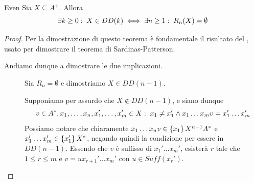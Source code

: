 \begin{theorem}{Even}
  Sia \(X \subseteq A^+\). Allora 
  \[\exists k \geq 0 :\; X \in DD(k) \iff \exists n \geq 1 :\; R_n(X) = \emptyset\]
\end{theorem}

\begin{proof}
  Per la dimostrazione di questo teorema è fondamentale il risultato del , usato per dimostrare il teorema di Sardinas-Patterson.

  Andiamo dunque a dimostrare le due implicazioni.
  \begin{description}
    \item[\q{\(\impliedby\)}] 
      Sia \(R_n = \emptyset\) e dimostriamo \(X \in DD(n-1)\).

      Supponiamo per assurdo che \(X \not\in DD(n-1)\), e siano dunque
      \[v \in A^*, x_1,\ldots,x_n,x_1',\ldots,x_m' \in X :\; x_1\neq x_1' \land x_1\ldots x_m v = x_1'\ldots x_m'\]
      Possiamo notare che chiaramente \(x_1\ldots x_n v \in \set{x_1}X^{n-1}A^*\) e \(x_1'\ldots x_m' \in \set{x_1'}X^* \), negando quindi la condizione per essere in \(DD(n-1)\).
      Essendo che \(v\) è suffisso di \(x_1'\ldots x_m'\), esisterà  \(r\) tale che \(1 \leq r \leq m\) e \(v = u x_{r+1}'\ldots x_m'\) con \(u \in Suff(x_r')\).


\end{description}
\end{proof}
